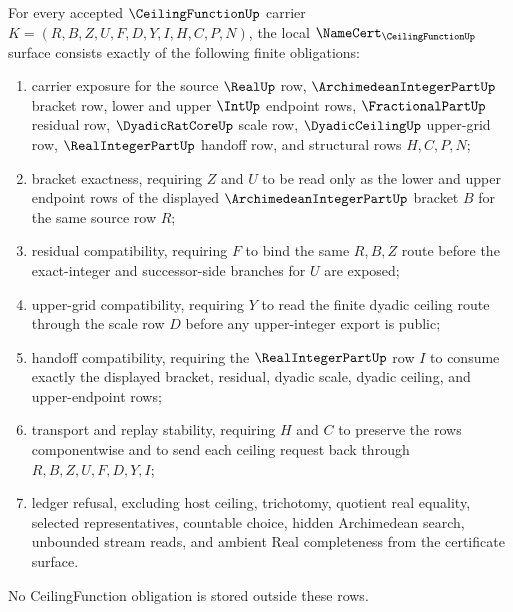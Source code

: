 \begin{theorem}
\label{thm:ceiling-function-namecert-obligations}
For every accepted $\CeilingFunctionUp$ carrier $K=(R,B,Z,U,F,D,Y,I,H,C,P,N)$, the local $\NameCert_{\CeilingFunctionUp}$ surface consists exactly of the following finite obligations:
\begin{enumerate}
\item carrier exposure for the source $\RealUp$ row, $\ArchimedeanIntegerPartUp$ bracket row, lower and upper $\IntUp$ endpoint rows, $\FractionalPartUp$ residual row, $\DyadicRatCoreUp$ scale row, $\DyadicCeilingUp$ upper-grid row, $\RealIntegerPartUp$ handoff row, and structural rows $H,C,P,N$;
\item bracket exactness, requiring $Z$ and $U$ to be read only as the lower and upper endpoint rows of the displayed $\ArchimedeanIntegerPartUp$ bracket $B$ for the same source row $R$;
\item residual compatibility, requiring $F$ to bind the same $R,B,Z$ route before the exact-integer and successor-side branches for $U$ are exposed;
\item upper-grid compatibility, requiring $Y$ to read the finite dyadic ceiling route through the scale row $D$ before any upper-integer export is public;
\item handoff compatibility, requiring the $\RealIntegerPartUp$ row $I$ to consume exactly the displayed bracket, residual, dyadic scale, dyadic ceiling, and upper-endpoint rows;
\item transport and replay stability, requiring $H$ and $C$ to preserve the rows componentwise and to send each ceiling request back through $R,B,Z,U,F,D,Y,I$;
\item ledger refusal, excluding host ceiling, trichotomy, quotient real equality, selected representatives, countable choice, hidden Archimedean search, unbounded stream reads, and ambient Real completeness from the certificate surface.
\end{enumerate}
No CeilingFunction obligation is stored outside these rows.
\end{theorem}
